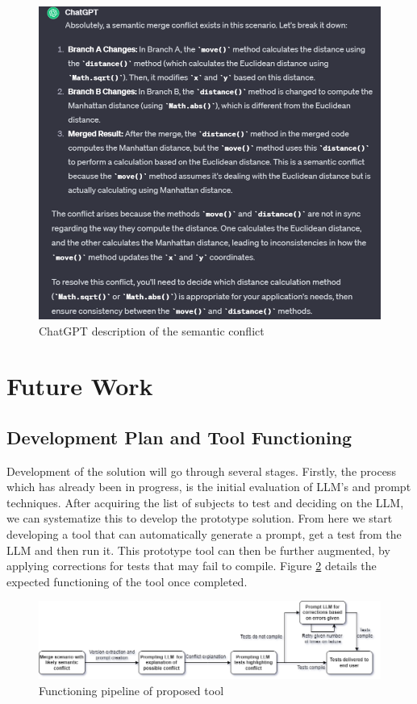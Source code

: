 \begin{figure}
    \centering
    \includegraphics[width=0.75\linewidth]{figures/image.png}
    \caption{ChatGPT description of the semantic conflict}
    \label{fig:semconf}
\end{figure}



\section{Future Work}

\subsection{Development Plan and Tool Functioning}

Development of the solution will go through several stages. Firstly, the process which has already been in progress, is the initial evaluation of LLM's and prompt techniques. After acquiring the list of subjects to test and deciding on the LLM, we can systematize this to develop the prototype solution. From here we start developing a tool that can automatically generate a prompt, get a test from the LLM and then run it. This prototype tool can then be further augmented, by applying corrections for tests that may fail to compile. Figure \ref{fig:tool} details the expected functioning of the tool once completed.

\begin{figure}
    \centering
    \includegraphics[width=1\linewidth]{figures/tool.png}
    \caption{Functioning pipeline of proposed tool}
    \label{fig:tool}
\end{figure}

